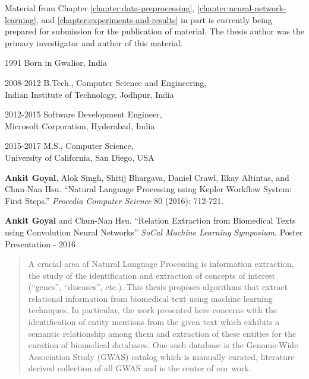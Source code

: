 \begin{frontmatter}
\begin{acknowledgements}
Material from Chapter \ref{chapter:data-preprocessing}, \ref{chapter:neural-network-learning}, and \ref{chapter:experiments-and-results} in part is currently being prepared for submission for the publication of material. The thesis author was the primary investigator and author of this material. 

\end{acknowledgements}

\begin{vitapage}
    \begin{vita}
        \item[1991]Born in Gwalior, India
        
        \item[2008-2012]B.Tech., Computer Science and Engineering, \\
        Indian Institute of Technology, Jodhpur, India
        
        \item[2012-2015]Software Development Engineer, \\
        Microsoft Corporation, Hyderabad, India
        
        \item[2015-2017]M.S., Computer Science,\\
        University of California, San Diego, USA
    \end{vita}
    
    \begin{publications}
        \item \textbf{Ankit Goyal}, Alok Singh, Shitij Bhargava, Daniel Crawl, Ilkay Altintas, and Chun-Nan Hsu. ``Natural Language Processing using Kepler Workflow System: First Steps.'' {\it Procedia Computer Science} 80 (2016): 712-721.
        
        \item \textbf{Ankit Goyal} and Chun-Nan Hsu. ``Relation Extraction from Biomedical Texts using Convolution Neural Networks'' {\it SoCal Machine Learning Symposium}. Poster Presentation - 2016
    \end{publications}
\end{vitapage}

\begin{abstract}
A crucial area of Natural Language Processing is information extraction, the study of the identification and extraction of concepts of interest (``genes'', ``diseases'', etc.). This thesis proposes algorithms that extract relational information from biomedical text using machine learning techniques. In particular, the work presented here concerns with the identification of entity mentions from the given text which exhibits a semantic relationship among them and extraction of these entities for the curation of biomedical databases. One such database is the Genome-Wide Association Study (GWAS) catalog which is manually curated, literature-derived collection of all GWAS and is the center of our work. 


\end{abstract}
\end{frontmatter}
